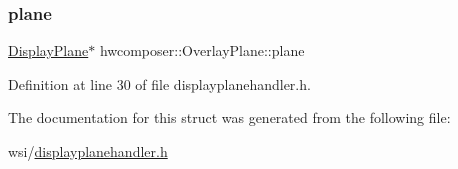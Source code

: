 \mbox{\label{structhwcomposer_1_1OverlayPlane_a597d0d3f4ab54cfe7e769d3316f63ec7}} 
\subsubsection{\texorpdfstring{plane}{plane}}
{\footnotesize\ttfamily \mbox{\hyperlink{classhwcomposer_1_1DisplayPlane}{Display\+Plane}}$\ast$ hwcomposer\+::\+Overlay\+Plane\+::plane}



Definition at line 30 of file displayplanehandler.\+h.



The documentation for this struct was generated from the following file\+:\begin{DoxyCompactItemize}
\item 
wsi/\mbox{\hyperlink{displayplanehandler_8h}{displayplanehandler.\+h}}\end{DoxyCompactItemize}
